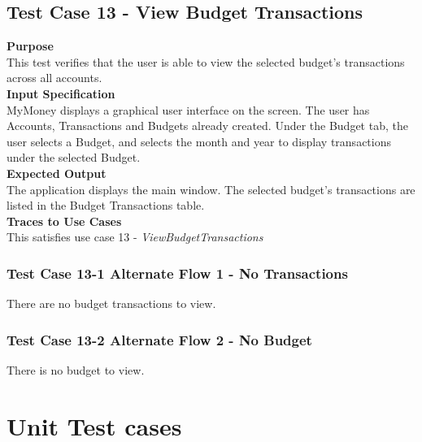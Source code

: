\documentclass[12pt]{article}
\begin{document}
\clearpage 

\subsection{Test Case 13 - View Budget Transactions} \label{TC-13}
\noindent
{\bf Purpose}\\
This test verifies that the user is able to view the selected budget's transactions across all accounts.\\                    
                            
\noindent
{\bf Input Specification}\\
MyMoney displays a graphical user interface on the screen. The user has Accounts, Transactions and Budgets already created. Under the Budget tab, the user selects a Budget, and selects the month and year to display transactions under the selected Budget.\\

\noindent
{\bf Expected Output}\\
The application displays the main window. The selected budget's transactions are listed in the Budget Transactions table.\\

\noindent
{\bf Traces to Use Cases}\\
This satisfies use case 13 - \textit{ViewBudgetTransactions}

\subsubsection
{Test Case 13-1 Alternate Flow 1 - No Transactions}
There are no budget transactions to view. 

\subsubsection
{Test Case 13-2 Alternate Flow 2 - No Budget}
There is no budget to view. 

\clearpage




\section{Unit Test cases}

\end{document}
